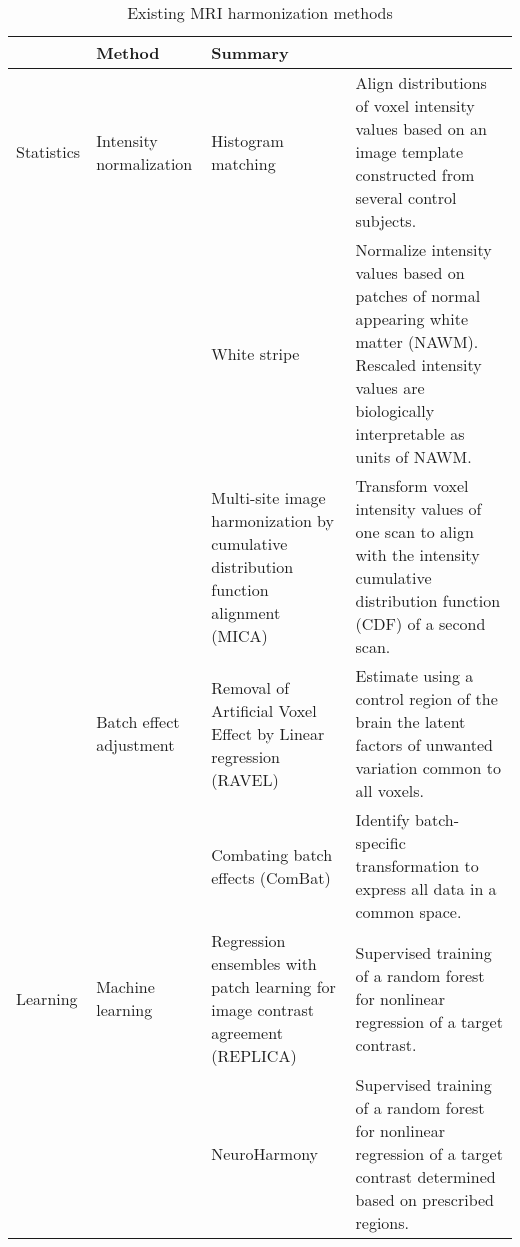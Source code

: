 \documentclass{nature}
\begin{document}
\begin{table*}[!t]
	\renewcommand\arraystretch{1.5}
	\scriptsize
	\centering
	\caption{Existing MRI harmonization methods}
	\begin{tabularx}{\textwidth}{l|l|X|X}
		\specialrule{2pt}{8pt}{0pt}
		\multicolumn{2}{l|}{Category}                                                                                          & Method               & Summary        \\ \hline
		Statistics & Intensity normalization & Histogram matching\cite{He2013Intensity,Nyul1999On,Shah2011Evaluating} & Align distributions of voxel intensity values based on an image template constructed from several control subjects.\\ \cline{3-4} 
		& & White stripe\cite{Shinohara2014Statistical}  & Normalize intensity values based on patches of normal appearing white matter (NAWM). Rescaled intensity values are biologically interpretable as units of NAWM.\\ \cline{3-4}
		&  & Multi-site image harmonization by cumulative distribution function alignment (MICA)\cite{Wrobel2020Intensity} & Transform voxel intensity values of one scan to align with the intensity cumulative distribution function (CDF) of a second scan.\\ \cline{2-4}
		& Batch effect adjustment & Removal of Artificial Voxel Effect by Linear regression (RAVEL)\cite{Fortin2016Removing} & Estimate using a control region of the brain the latent factors of unwanted variation common to all voxels.\\ \cline{3-4} 
		&  & Combating batch effects (ComBat)\cite{Fortin2017Harmonization,Fortin2018Harmonization} & Identify batch-specific transformation to express all data in a common space. \\ \hline
		Learning  & Machine learning & Regression ensembles with patch learning for image contrast agreement (REPLICA)\cite{Jog2017Random} & Supervised training of a random forest for nonlinear regression of a target contrast.\\ \cline{3-4}
		& & NeuroHarmony\cite{Garcia-Dias2020Neuroharmony} & Supervised training of a random forest for nonlinear regression of a target contrast determined based on prescribed regions.\\ \cline{2-4}

\end{tabularx}
\end{table*}
\end{document}
